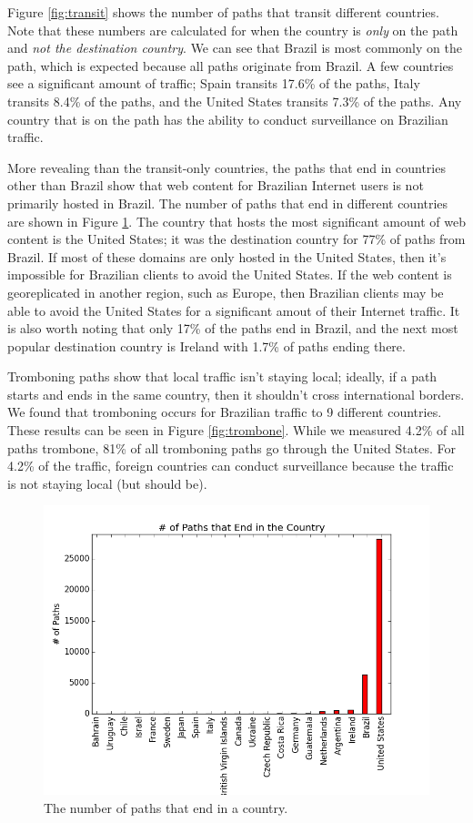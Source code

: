 Figure \ref{fig:transit} shows the number of paths that transit different countries.  Note that these numbers are calculated for when the country is \textit{only} on the path and \textit{not the destination country}.  We can see that Brazil is most commonly on the path, which is expected because all paths originate from Brazil.  A few countries see a significant amount of traffic; Spain transits 17.6\% of the paths, Italy transits 8.4\% of the paths, and the United States transits 7.3\% of the paths.  Any country that is on the path has the ability to conduct surveillance on Brazilian traffic.  

More revealing than the transit-only countries, the paths that end in countries other than Brazil show that web content for Brazilian Internet users is not primarily hosted in Brazil.  The number of paths that end in different countries are shown in Figure \ref{fig:host}.  The country that hosts the most significant amount of web content is the United States; it was the destination country for 77\% of paths from Brazil.  If most of these domains are only hosted in the United States, then it's impossible for Brazilian clients to avoid the United States.  If the web content is georeplicated in another region, such as Europe, then Brazilian clients may be able to avoid the United States for a significant amout of their Internet traffic.  It is also worth noting that only 17\% of the paths end in Brazil, and the next most popular destination country is Ireland with 1.7\% of paths ending there.  

Tromboning paths show that local traffic isn't staying local; ideally, if a path starts and ends in the same country, then it shouldn't cross international borders.  We found that tromboning occurs for Brazilian traffic to 9 different countries.  These results can be seen in Figure \ref{fig:trombone}.  While we measured 4.2\% of all paths trombone, 81\% of all tromboning paths go through the United States.  For 4.2\% of the traffic, foreign countries can conduct surveillance because the traffic is not staying local (but should be). 

\begin{figure}[t!]
\centering
\includegraphics[width=.8\textwidth]{host_graph_no_zero}
\caption{The number of paths that end in a country.}
\label{fig:host}
\end{figure} 

